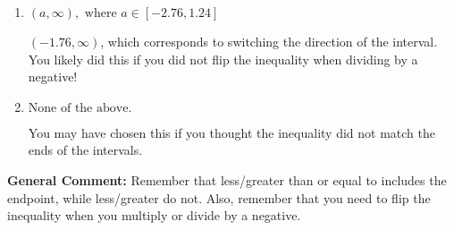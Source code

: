 \documentclass{extbook}[14pt]
\begin{document}
\begin{enumerate}
{\begin{enumerate}[label=\Alph*.]
 $(1.76, \infty)$, which corresponds to switching the direction of the interval AND negating the endpoint. You likely did this if you did not flip the inequality when dividing by a negative as well as not moving values over to a side properly.
\item \( (a, \infty), \text{ where } a \in [-2.76, 1.24] \)

 $(-1.76, \infty)$, which corresponds to switching the direction of the interval. You likely did this if you did not flip the inequality when dividing by a negative!
\item \( \text{None of the above}. \)

You may have chosen this if you thought the inequality did not match the ends of the intervals.
\end{enumerate}

\textbf{General Comment:} Remember that less/greater than or equal to includes the endpoint, while less/greater do not. Also, remember that you need to flip the inequality when you multiply or divide by a negative.
}
\end{enumerate}
\end{document}
